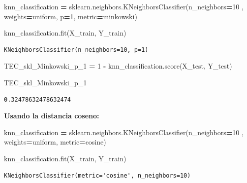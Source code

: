 \documentclass[
  11pt,
  a4paper,
]{article}
\newenvironment{Shaded}{\begin{snugshade}}{\end{snugshade}}
\newcommand{\DecValTok}[1]{\textcolor[rgb]{0.00,0.00,0.81}{#1}}
\newcommand{\NormalTok}[1]{#1}
\newcommand{\OperatorTok}[1]{\textcolor[rgb]{0.81,0.36,0.00}{\textbf{#1}}}
\newcommand{\StringTok}[1]{\textcolor[rgb]{0.31,0.60,0.02}{#1}}
\begin{document}
\begin{Shaded}
\begin{Highlighting}[]
\NormalTok{knn\_classification }\OperatorTok{=}\NormalTok{ sklearn.neighbors.KNeighborsClassifier(n\_neighbors}\OperatorTok{=}\DecValTok{10}\NormalTok{ ,  weights}\OperatorTok{=}\StringTok{\textquotesingle{}uniform\textquotesingle{}}\NormalTok{, p}\OperatorTok{=}\DecValTok{1}\NormalTok{, metric}\OperatorTok{=}\StringTok{\textquotesingle{}minkowski\textquotesingle{}}\NormalTok{)}

\NormalTok{knn\_classification.fit(X\_train, Y\_train)}
\end{Highlighting}
\end{Shaded}

\begin{verbatim}
KNeighborsClassifier(n_neighbors=10, p=1)
\end{verbatim}

\begin{Shaded}
\begin{Highlighting}[]
\NormalTok{TEC\_skl\_Minkowski\_p\_1 }\OperatorTok{=} \DecValTok{1} \OperatorTok{{-}}\NormalTok{ knn\_classification.score(X\_test, Y\_test)}

\NormalTok{TEC\_skl\_Minkowski\_p\_1}
\end{Highlighting}
\end{Shaded}

\begin{verbatim}
0.32478632478632474
\end{verbatim}

\vspace{0.2cm}

\textbf{Usando la distancia coseno:}

\begin{Shaded}
\begin{Highlighting}[]
\NormalTok{knn\_classification }\OperatorTok{=}\NormalTok{ sklearn.neighbors.KNeighborsClassifier(n\_neighbors}\OperatorTok{=}\DecValTok{10}\NormalTok{ ,  weights}\OperatorTok{=}\StringTok{\textquotesingle{}uniform\textquotesingle{}}\NormalTok{, metric}\OperatorTok{=}\StringTok{\textquotesingle{}cosine\textquotesingle{}}\NormalTok{)}

\NormalTok{knn\_classification.fit(X\_train, Y\_train)}
\end{Highlighting}
\end{Shaded}

\begin{verbatim}
KNeighborsClassifier(metric='cosine', n_neighbors=10)
\end{verbatim}
\end{document}
